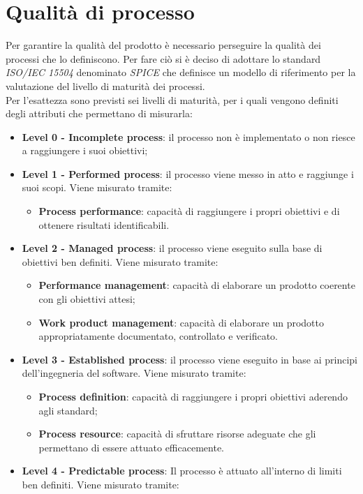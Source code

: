 \newpage
\section{Qualità di processo}
Per garantire la qualità del prodotto è necessario perseguire la qualità dei processi che lo definiscono. Per fare ciò si è deciso di adottare lo standard \textit{ISO/IEC 15504} denominato \textit{SPICE} che definisce un modello di riferimento per la valutazione del livello di maturità dei processi. \\ 
Per l'esattezza sono previsti sei livelli di maturità, per i quali vengono definiti degli attributi che permettano di misurarla:
\begin{itemize}
\item\textbf{Level 0 - Incomplete process}: il processo non è implementato o non riesce a raggiungere i suoi obiettivi;
\item\textbf{Level 1 - Performed process}: il processo viene messo in atto e raggiunge i suoi scopi. Viene misurato tramite:
\begin{itemize}
\item\textbf{Process performance}: capacità di raggiungere i propri obiettivi e di ottenere risultati identificabili.
\end{itemize}
\item\textbf{Level 2 - Managed process}: il processo viene eseguito sulla base di obiettivi ben definiti. Viene misurato tramite:
\begin{itemize}
\item\textbf{Performance management}: capacità di elaborare un prodotto coerente con gli obiettivi attesi;
\item\textbf{Work product management}: capacità di elaborare un prodotto appropriatamente documentato, controllato e verificato.
\end{itemize}
\item\textbf{Level 3 - Established process}: il processo viene eseguito in base ai principi dell’ingegneria del software. Viene misurato tramite:
\begin{itemize}
\item\textbf{Process definition}: capacità di raggiungere i propri obiettivi aderendo agli standard;
\item\textbf{Process resource}: capacità di sfruttare risorse adeguate che gli permettano di essere attuato efficacemente.
\end{itemize}
\item\textbf{Level 4 - Predictable process}: Il processo è attuato all'interno di limiti ben definiti. Viene misurato tramite:

\end{itemize}
